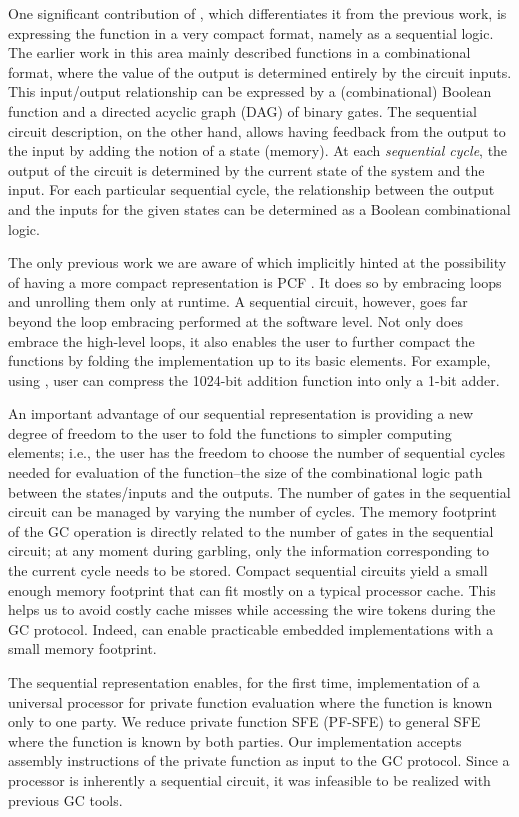 One significant contribution of \sys{}, which differentiates it from the previous work, is expressing the function in a very compact format, namely as a sequential logic.
The earlier work in this area mainly described functions in a combinational format, where the value of the output is determined entirely by the circuit inputs.
This input/output relationship can be expressed by a (combinational) Boolean function and a directed acyclic graph (DAG) of binary gates.
The sequential circuit description, on the other hand, allows having feedback from the output to the input by adding the notion of a state (memory).
At each \emph{sequential cycle}, the output of the circuit is determined by the current state of the system and the input.
For each particular sequential cycle, the relationship between the output and the inputs for the given states can be determined as a Boolean combinational logic.

The only previous work we are aware of which implicitly hinted at the possibility of having a more compact representation is PCF \cite{kreuter2013pcf}.
It does so by embracing loops and unrolling them only at runtime.
A sequential circuit, however, goes far beyond the loop embracing performed at the software level.
Not only does \sys{} embrace the high-level loops, it also enables the user to further compact the functions by folding the implementation up to its basic elements.
For example, using \sys{}, user can compress the 1024-bit addition function into only a 1-bit adder.

An important advantage of our sequential representation is providing a new degree of freedom to the user to fold the functions to simpler computing elements; i.e., the user has the freedom to choose the number of sequential cycles needed for evaluation of the function--the size of the combinational logic path between the states/inputs and the outputs.
The number of gates in the sequential circuit can be managed by varying the number of cycles.
The memory footprint of the GC operation is directly related to the number of gates in the sequential circuit; at any moment during garbling, only the information corresponding to the current cycle needs to be stored.
Compact sequential circuits yield a small enough memory footprint that can fit mostly on a typical processor cache.
This helps us to avoid costly cache misses while accessing the wire tokens during the GC protocol.
Indeed, \sys{} can enable practicable embedded implementations with a small memory footprint.

The sequential representation enables, for the first time, implementation of a universal processor for private function evaluation where the function is known only to one party.
We reduce private function SFE (PF-SFE) to general SFE where the function is known by both parties.
Our implementation accepts assembly instructions of the private function as input to the GC protocol.
Since a processor is inherently a sequential circuit, it was infeasible to be realized with previous GC tools.

